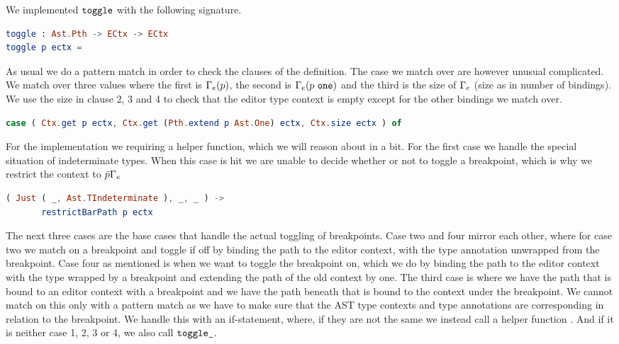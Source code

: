 We implemented $\texttt{toggle}$ with the following signature.
\begin{lstlisting}[language=elm,%
    gobble=0,%
    ]
toggle : Ast.Pth -> ECtx -> ECtx
toggle p ectx =
\end{lstlisting}
As usual we do a pattern match in order to check the clauses of the definition.
The case we match over are however unusual complicated. We match over three
values where the first is $\Gamma_{e}(p)$, the second is $\Gamma_{e}(p~\texttt{one})$
and the third is the size of $\Gamma_{e}$ (size as in number of bindings). We use
the size in clause 2, 3 and 4 to check that the editor type context is empty
except for the other bindings we match over.
\begin{lstlisting}[language=elm,%
    gobble=4,%
    ]
    case ( Ctx.get p ectx, Ctx.get (Pth.extend p Ast.One) ectx, Ctx.size ectx ) of
\end{lstlisting}

For the implementation we requiring a helper function, which we will reason
about in a bit. For the first case we handle the special situation of
indeterminate types. When this case is hit we are unable to decide whether or
not to toggle a breakpoint, which is why we restrict the context to
$\bar{p}\Gamma_{e}$
\begin{lstlisting}[language=elm,%
    gobble=4,%
    ]
    ( Just ( _, Ast.TIndeterminate ), _, _ ) ->
       restrictBarPath p ectx
\end{lstlisting}

The next three cases are the base cases that handle the actual toggling of
breakpoints. Case two and four mirror each other, where for case two we match
on a breakpoint and toggle if off by binding the path to the editor context,
with the type annotation unwrapped from the breakpoint. Case four as mentioned
is when we want to toggle the breakpoint on, which we do by binding the path to
the editor context with the type wrapped by a breakpoint and extending the path
of the old context by one. The third case is where we have the path that is
bound to an editor context with a breakpoint and we have the path beneath that
is bound to the context under the breakpoint. We cannot match on this only with
a pattern match as we have to make sure that the AST type contexts and type
annotations are corresponding in relation to the breakpoint. We handle this
with an if-statement, where, if they are not the same we instead call a helper
function . And if it is neither case 1, 2, 3 or 4, we also call $\texttt{toggle\_}$.


